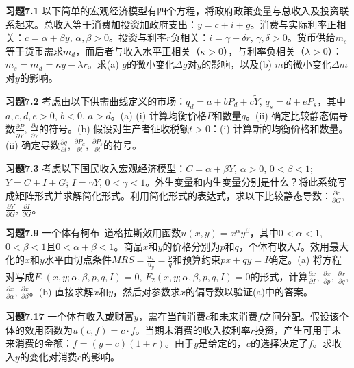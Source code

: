 \begin{translation}
\textbf{习题7.1} 以下简单的宏观经济模型有四个方程，将政府政策变量与总收入及投资联系起来。总收入等于消费加投资加政府支出：$y = c + i + g$。消费与实际利率正相关：$c = \alpha + \beta y$, $\alpha, \beta > 0$。投资与利率$r$负相关：$i = \gamma - \delta r$, $\gamma, \delta > 0$。货币供给$m_s$等于货币需求$m_d$，而后者与收入水平正相关（$\kappa > 0$），与利率负相关（$\lambda > 0$）：$m_s = m_d = \kappa y - \lambda r$。求(a) $g$的微小变化$\Delta g$对$y$的影响，以及(b) $m$的微小变化$\Delta m$对$y$的影响。

\textbf{习题7.2} 考虑由以下供需曲线定义的市场：$q_d = a + bP_d + c\tilde{Y}$, $q_s = d + eP_s$，其中$a, c, d, e > 0$, $b < 0$, $a > d$。(a) (i) 计算均衡价格$P$和数量$q$。(ii) 确定比较静态偏导数$\frac{\partial P}{\partial \tilde{Y}}$, $\frac{\partial q}{\partial \tilde{Y}}$的符号。(b) 假设对生产者征收税额$t > 0$：(i) 计算新的均衡价格和数量。(ii) 确定导数$\frac{\partial q}{\partial t}$, $\frac{\partial P_d}{\partial t}$, $\frac{\partial P_s}{\partial t}$的符号。

\textbf{习题7.3} 考虑以下国民收入宏观经济模型：$C = \alpha + \beta Y$, $\alpha > 0$, $0 < \beta < 1$; $Y = C + I + G$; $I = \gamma Y$, $0 < \gamma < 1$。外生变量和内生变量分别是什么？将此系统写成矩阵形式并求解简化形式。利用简化形式的表达式，求以下比较静态导数：$\frac{\partial c}{\partial G}$, $\frac{\partial Y}{\partial G}$, $\frac{\partial I}{\partial G}$。

\textbf{习题7.9} 一个体有柯布--道格拉斯效用函数$u(x, y) = x^\alpha y^\beta$，其中$0 < \alpha < 1$, $0 < \beta < 1$且$0 < \alpha + \beta < 1$。商品$x$和$y$的价格分别为$p$和$q$，个体有收入$I$。效用最大化的$x$和$y$水平由切点条件$MRS = \frac{u_x}{u_y} = \frac{p}{q}$和预算约束$px + qy = I$确定。(a) 将方程对写成$F_1(x, y; \alpha, \beta, p, q, I) = 0$, $F_2(x, y; \alpha, \beta, p, q, I) = 0$的形式，计算$\frac{\partial x}{\partial I}$, $\frac{\partial x}{\partial p}$, $\frac{\partial x}{\partial q}$, $\frac{\partial x}{\partial \alpha}$, $\frac{\partial x}{\partial \beta}$。(b) 直接求解$x$和$y$，然后对参数求$x$的偏导数以验证(a)中的答案。

\textbf{习题7.17} 一个体有收入或财富$y$，需在当前消费$c$和未来消费$f$之间分配。假设该个体的效用函数为$u(c, f) = c \cdot f$。当期未消费的收入按利率$r$投资，产生可用于未来消费的金额：$f = (y - c)(1 + r)$。由于$y$是给定的，$c$的选择决定了$f$。求收入$y$的变化对消费$c$的影响。
\end{translation}


